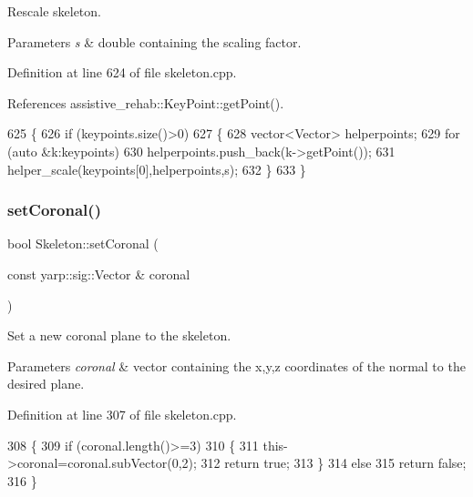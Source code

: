 Rescale skeleton. 


\begin{DoxyParams}{Parameters}
{\em s} & double containing the scaling factor. \\
\hline
\end{DoxyParams}


Definition at line 624 of file skeleton.\+cpp.



References assistive\+\_\+rehab\+::\+Key\+Point\+::get\+Point().


\begin{DoxyCode}
625 \{
626     \textcolor{keywordflow}{if} (keypoints.size()>0)
627     \{
628         vector<Vector> helperpoints;
629         \textcolor{keywordflow}{for} (\textcolor{keyword}{auto} &k:keypoints)
630             helperpoints.push\_back(k->getPoint());
631         helper\_scale(keypoints[0],helperpoints,s);
632     \}
633 \}
\end{DoxyCode}
\mbox{\label{classassistive__rehab_1_1Skeleton_ab3bd697f48ea69cfdc5ff7574c19041f}} 
\subsubsection{\texorpdfstring{set\+Coronal()}{setCoronal()}}
{\footnotesize\ttfamily bool Skeleton\+::set\+Coronal (\begin{DoxyParamCaption}\item[{const yarp\+::sig\+::\+Vector \&}]{coronal }\end{DoxyParamCaption})}



Set a new coronal plane to the skeleton. 


\begin{DoxyParams}{Parameters}
{\em coronal} & vector containing the x,y,z coordinates of the normal to the desired plane. \\
\hline
\end{DoxyParams}


Definition at line 307 of file skeleton.\+cpp.


\begin{DoxyCode}
308 \{
309     \textcolor{keywordflow}{if} (coronal.length()>=3)
310     \{
311         this->coronal=coronal.subVector(0,2);
312         \textcolor{keywordflow}{return} \textcolor{keyword}{true};
313     \}
314     \textcolor{keywordflow}{else}
315         \textcolor{keywordflow}{return} \textcolor{keyword}{false};
316 \}
\end{DoxyCode}
\mbox{\label{classassistive__rehab_1_1Skeleton_af92fdb0e3eb88a0b1dedd5038e2c6eb7}} 

